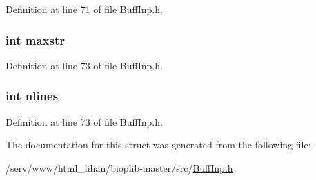 Definition at line 71 of file Buff\-Inp.\-h.

\hypertarget{struct_i_n_b_u_f_f_e_r_a93ee708d9167216da4fecb84d98715c0}{
\subsubsection[{maxstr}]{\setlength{\rightskip}{0pt plus 5cm}int maxstr}}\label{struct_i_n_b_u_f_f_e_r_a93ee708d9167216da4fecb84d98715c0}


Definition at line 73 of file Buff\-Inp.\-h.

\hypertarget{struct_i_n_b_u_f_f_e_r_af69ee38d2c862dbc6769fa27c5320b96}{
\subsubsection[{nlines}]{\setlength{\rightskip}{0pt plus 5cm}int nlines}}\label{struct_i_n_b_u_f_f_e_r_af69ee38d2c862dbc6769fa27c5320b96}


Definition at line 73 of file Buff\-Inp.\-h.



The documentation for this struct was generated from the following file\-:\begin{DoxyCompactItemize}
\item 
/serv/www/html\-\_\-lilian/bioplib-\/master/src/\hyperlink{_buff_inp_8h}{Buff\-Inp.\-h}\end{DoxyCompactItemize}
